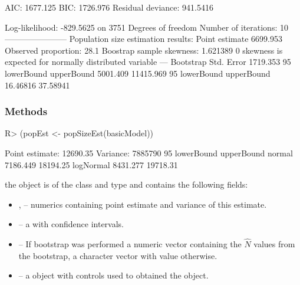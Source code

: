 \documentclass[
]{jss}
\newcommand{\1}{\mathcal{I}} \newcommand{\bZero}{\boldsymbol{0}}
\begin{document}
\begin{CodeChunk}
\begin{CodeOutput}
AIC: 1677.125
BIC: 1726.976
Residual deviance: 941.5416

Log-likelihood: -829.5625 on 3751 Degrees of freedom 
Number of iterations: 10
-----------------------
Population size estimation results: 
Point estimate 6699.953
Observed proportion: 28.1%
Boostrap sample skewness: 1.621389
0 skewness is expected for normally distributed variable
---
Bootstrap Std. Error 1719.353
95%
lowerBound upperBound 
  5001.409  11415.969 
95%
lowerBound upperBound 
  16.46816   37.58941 
\end{CodeOutput}
\end{CodeChunk}

\subsubsection{Methods}\label{methods}

\begin{CodeChunk}
\begin{CodeInput}
R> (popEst <- popSizeEst(basicModel))
\end{CodeInput}
\begin{CodeOutput}
Point estimate: 12690.35
Variance: 7885790
95%
          lowerBound upperBound
normal      7186.449   18194.25
logNormal   8431.277   19718.31
\end{CodeOutput}
\end{CodeChunk}

the  object is of the  class and
 type and contains the following fields:

\begin{itemize}
  \item {},  -- numerics containing point estimate and variance of this estimate.
  \item {} -- a  with confidence intervals.
  \item {} -- If bootstrap was performed a numeric vector containing the $\hat{N}$ values from the bootstrap, 
  a character vector with value  otherwise.
  \item {} -- a  object with controls used to obtained the object.
\end{itemize}

\small
\end{document}
